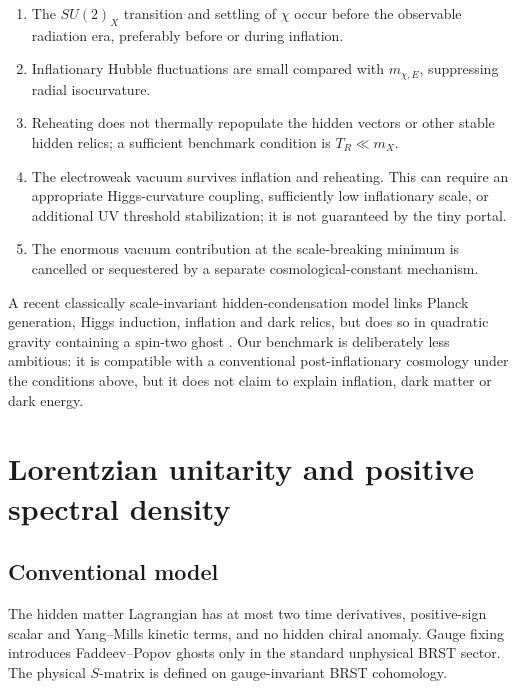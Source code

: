 \documentclass[11pt,a4paper]{article}
\begin{document}
\begin{enumerate}
  \item The $SU(2)_X$ transition and settling of $\chi$ occur before the observable radiation era, preferably before or during inflation.
  \item Inflationary Hubble fluctuations are small compared with $m_{\chi,E}$, suppressing radial isocurvature.
  \item Reheating does not thermally repopulate the hidden vectors or other stable hidden relics; a sufficient benchmark condition is $T_R\ll m_X$.
  \item The electroweak vacuum survives inflation and reheating. This can require an appropriate Higgs-curvature coupling, sufficiently low inflationary scale, or additional UV threshold stabilization; it is not guaranteed by the tiny portal.
  \item The enormous vacuum contribution at the scale-breaking minimum is cancelled or sequestered by a separate cosmological-constant mechanism.
\end{enumerate}

A recent classically scale-invariant hidden-condensation model links Planck generation, Higgs induction, inflation and dark relics, but does so in quadratic gravity containing a spin-two ghost \cite{Wami2026}. Our benchmark is deliberately less ambitious: it is compatible with a conventional post-inflationary cosmology under the conditions above, but it does not claim to explain inflation, dark matter or dark energy.

\section{Lorentzian unitarity and positive spectral density}

\subsection{Conventional model}

The hidden matter Lagrangian has at most two time derivatives, positive-sign scalar and Yang--Mills kinetic terms, and no hidden chiral anomaly. Gauge fixing introduces Faddeev--Popov ghosts only in the standard unphysical BRST sector. The physical $S$-matrix is defined on gauge-invariant BRST cohomology.
\end{document}
